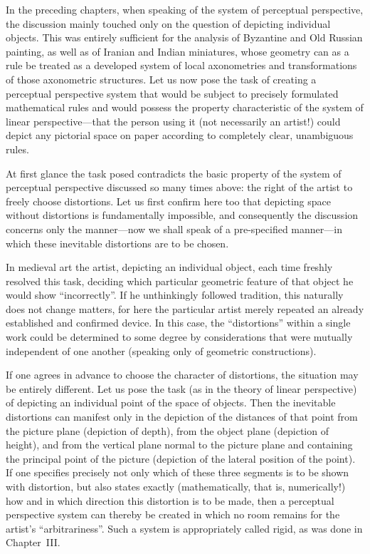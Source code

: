 In the preceding chapters, when speaking of the system of perceptual perspective,
the discussion mainly touched only on the question of depicting individual objects.
This was entirely sufficient for the analysis of Byzantine and Old Russian painting,
as well as of Iranian and Indian miniatures, whose geometry can as a rule be treated
as a developed system of local axonometries and transformations of those axonometric
structures. Let us now pose the task of creating a perceptual perspective system
that would be subject to precisely formulated mathematical rules and would possess
the property characteristic of the system of linear perspective---that the person
using it (not necessarily an artist!) could depict any pictorial space on paper
according to completely clear, unambiguous rules.

At first glance the task posed contradicts the basic property of the system of
perceptual perspective discussed so many times above: the right of the artist to
freely choose distortions. Let us first confirm here too that depicting space
without distortions is fundamentally impossible, and consequently the discussion
concerns only the manner---now we shall speak of a pre-specified manner---in which
these inevitable distortions are to be chosen.


In medieval art the artist, depicting an individual object, each time freshly
resolved this task, deciding which particular geometric feature of that object he
would show ``incorrectly''. If he unthinkingly followed tradition, this naturally
does not change matters, for here the particular artist merely repeated an already
established and confirmed device. In this case, the ``distortions'' within a single
work could be determined to some degree by considerations that were mutually
independent of one another (speaking only of geometric constructions).

If one agrees in advance to choose the character of distortions, the situation may
be entirely different. Let us pose the task (as in the theory of linear perspective)
of depicting an individual point of the space of objects. Then the inevitable
distortions can manifest only in the depiction of the distances of that point from
the picture plane (depiction of depth), from the object plane (depiction of height),
and from the vertical plane normal to the picture plane and containing the principal
point of the picture (depiction of the lateral position of the point). If one
specifies precisely not only which of these three segments is to be shown with
distortion, but also states exactly (mathematically, that is, numerically!) how and
in which direction this distortion is to be made, then a perceptual perspective
system can thereby be created in which no room remains for the artist's
``arbitrariness''. Such a system is appropriately called rigid, as was done in
Chapter~III.

